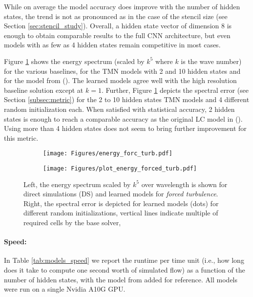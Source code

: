 While on average the model accuracy does improve with the number of hidden states, the trend is not as pronounced as in the case of the stencil size (see Section \ref{sec:stencil_study}). Overall, a hidden state vector of dimension 8 is enough to obtain comparable results to the full CNN architecture, but even models with as few as 4 hidden states remain competitive in most cases.

Figure \ref{fig:energy_forc_turb} shows the energy spectrum (scaled by $k^5$ where $k$ is the wave number) for the various baselines, for the TMN models with 2 and 10 hidden states and for the model from \citeauthor{kochkov2021machine} (\citeyear{kochkov2021machine}). The learned models agree well with the high resolution baseline solution except at $k=1$. Further, Figure \ref{fig:energy_forc_turb} depicts the spectral error (see Section \ref{subsec:metric}) for the 2 to 10 hidden states TMN models and 4 different random initialization each. When satisfied with statistical accuracy, 2 hidden states is enough to reach a comparable accuracy as the original LC model in \citeauthor{kochkov2021machine} (\citeyear{kochkov2021machine}). Using more than 4 hidden states does not seem to bring further improvement for this metric.

\begin{figure}[h!]
     \centering
     \begin{subfigure}[b]{0.49\columnwidth}
         \centering
         \texttt{[image: Figures/energy\_forc\_turb.pdf]}
     \end{subfigure}
     \hfill
     \begin{subfigure}[b]{0.49\columnwidth}
         \centering
         \texttt{[image: Figures/plot\_energy\_forced\_turb.pdf]}
     \end{subfigure}
     \caption{Left, the energy spectrum scaled by $k^5$ over wavelength is shown for direct simulations (DS) and learned models for \textit{forced turbulence}. Right, the spectral error is depicted for learned models (dots) for different random initializations, vertical lines indicate multiple of required cells by the base solver,}
     \label{fig:energy_forc_turb}
\end{figure}

\paragraph{Speed:} 
In Table \ref{tab:models_speed} we report the runtime per time unit (i.e., how long does it take to compute one second worth of simulated flow) as a function of the number of hidden states, with the model from \citeauthor{kochkov2021machine} added for reference. All models were run on a single Nvidia A10G GPU.


